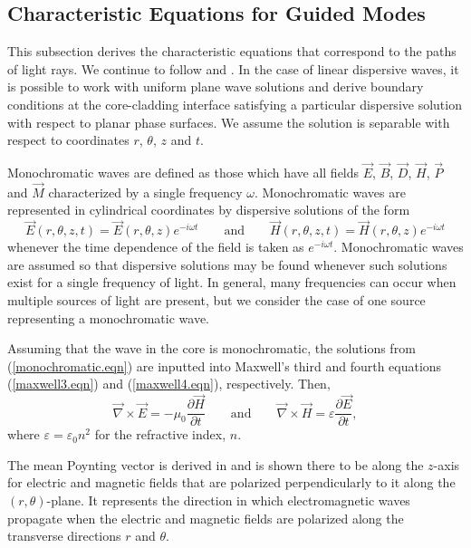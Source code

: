 \documentclass[12pt]{article}
\theoremstyle{definition}
\numberwithin{equation}{section}
\begin{document}
{\subsection{Characteristic Equations for Guided Modes}\label{modes.sec}
This subsection derives the characteristic equations that correspond to the paths of light rays. We continue to follow \cite{Okamoto} and \cite{Belanger}. In the case of linear dispersive waves, it is possible to work with uniform plane wave solutions and derive boundary conditions at the core-cladding interface satisfying a particular dispersive solution with respect to planar phase surfaces. We assume the solution is separable with respect to coordinates $r$, $\theta$, $z$ and $t$.

Monochromatic waves are defined as those which have all fields $\vec{E}$, $\vec{B}$, $\vec{D}$, $\vec{H}$, $\vec{P}$ and $\vec{M}$ characterized by a single frequency $\omega$. Monochromatic waves are represented in cylindrical coordinates by dispersive solutions of the form
\begin{equation}
\vec{E}(r,\theta,z,t)=\vec{E}(r,\theta,z)e^{-i\omega t}\qquad\mbox{and}\qquad\vec{H}(r,\theta,z,t)=\vec{H}(r,\theta,z)e^{-i\omega t}\nonumber
\label{monochromatic.eqn}
\end{equation}
whenever the time dependence of the field is taken as $e^{-i\omega t}$. Monochromatic waves are assumed so that dispersive solutions may be found whenever such solutions exist for a single frequency of light. In general, many frequencies can occur when multiple sources of light are present, but we consider the case of one source representing a monochromatic wave.  

Assuming that the wave in the core is monochromatic, the solutions from (\ref{monochromatic.eqn}) are inputted into Maxwell's third and fourth equations (\ref{maxwell3.eqn}) and (\ref{maxwell4.eqn}), respectively. Then, 
\begin{equation}
\vec{\nabla}\times\vec{E}=-\mu_0\frac{\partial\vec{H}}{\partial t}\qquad\mbox{and}\qquad\vec{\nabla}\times\vec{H}=\varepsilon\frac{\partial\vec{E}}{\partial t},\label{oscillatory_solution.eqn}
\end{equation}
where $\varepsilon=\varepsilon_0n^2$ for the refractive index, $n$.

The mean Poynting vector is derived in \cite{Belanger} and is shown there to be along the $z$-axis for electric and magnetic fields that are polarized perpendicularly to it along the $(r,\theta)$-plane. It represents the direction in which electromagnetic waves propagate when the electric and magnetic fields are polarized along the transverse directions $r$ and $\theta$.

}
\end{document}
